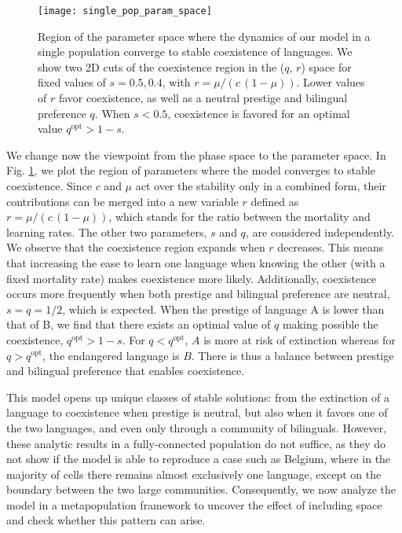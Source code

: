 \documentclass[../thesis.tex]{subfiles}
\begin{document}
\begin{figure}[h]
\centering
    \texttt{[image: single\_pop\_param\_space]}
    \caption{Region of the parameter space where the dynamics of our model in a single
    population converge to stable coexistence of languages. We show two 2D cuts of the
    coexistence region in the ($q$, $r$) space for fixed values of $s=0.5, 0.4$, with $r
    = \mu / (c \, (1-\mu))$. Lower values of $r$ favor coexistence, as well as a neutral
    prestige and bilingual preference $q$. When $s < 0.5$, coexistence is favored for an
    optimal value $q^\text{opt} > 1-s$.}
    \label{fig:coex_region}
\end{figure}

We change now the viewpoint from the phase space to the parameter space. In Fig.
\ref{fig:coex_region}, we plot the region of parameters where the model converges to
stable coexistence. Since $c$ and $\mu$ act over the stability only in a combined form,
their contributions can be merged into a new variable $r$ defined as $r = \mu/(c \,
(1-\mu))$, which stands for the ratio between the mortality and learning rates. The
other two parameters, $s$ and $q$, are considered independently. We observe that the
coexistence region expands when $r$ decreases. This means that increasing the ease to
learn one language when knowing the other (with a fixed mortality rate) makes
coexistence more likely. Additionally, coexistence occurs more frequently when both
prestige and bilingual preference are neutral, $s = q = 1/2$, which is expected. When
the prestige of language A is lower than that of B, we find that there exists an optimal
value of $q$ making possible the coexistence, $q^\text{opt} > 1-s$. For $q <
q^\text{opt}$, $A$ is more at risk of extinction whereas for $q > q^\text{opt}$, the
endangered language is $B$. There is thus a balance between prestige and bilingual
preference that enables coexistence. 

This model opens up unique classes of stable solutions: from the extinction of a
language to coexistence when prestige is neutral, but also when it favors one of the two
languages, and even only through a community of bilinguals. However, these analytic
results in a fully-connected population do not suffice, as they do not show if the model
is able to reproduce a case such as Belgium, where in the majority of cells there
remains almost exclusively one language, except on the boundary between the two large
communities. Consequently, we now analyze the model in a metapopulation framework to
uncover the effect of including space and check whether this pattern can arise.
\end{document}
